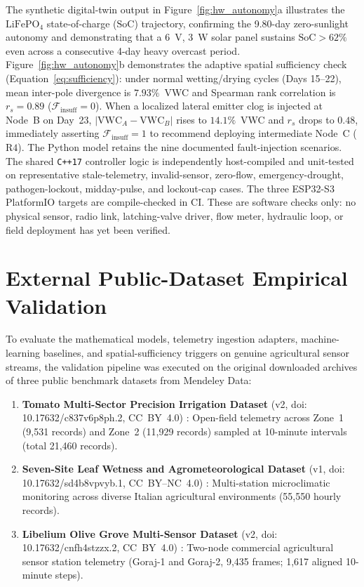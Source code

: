 \documentclass[10pt,twocolumn,a4paper]{article}
\begin{document}
The synthetic digital-twin output in Figure~\ref{fig:hw_autonomy}a illustrates the $\mathrm{LiFePO_4}$ state-of-charge ($\mathrm{SoC}$) trajectory, confirming the 9.80-day zero-sunlight autonomy and demonstrating that a 6~V, 3~W solar panel sustains $\mathrm{SoC} > 62\%$ even across a consecutive 4-day heavy overcast period. Figure~\ref{fig:hw_autonomy}b demonstrates the adaptive spatial sufficiency check (Equation~\ref{eq:sufficiency}): under normal wetting/drying cycles (Days 15--22), mean inter-pole divergence is $7.93\%$~VWC and Spearman rank correlation is $r_s = 0.89$ ($\mathcal{F}_{\text{insuff}} = 0$). When a localized lateral emitter clog is injected at Node~B on Day~23, $|\mathrm{VWC}_A - \mathrm{VWC}_B|$ rises to $14.1\%$~VWC and $r_s$ drops to $0.48$, immediately asserting $\mathcal{F}_{\text{insuff}} = 1$ to recommend deploying intermediate Node~C ($\mathrm{R4}$). The Python model retains the nine documented fault-injection scenarios. The shared \texttt{C++17} controller logic is independently host-compiled and unit-tested on representative stale-telemetry, invalid-sensor, zero-flow, emergency-drought, pathogen-lockout, midday-pulse, and lockout-cap cases. The three ESP32-S3 PlatformIO targets are compile-checked in CI. These are software checks only: no physical sensor, radio link, latching-valve driver, flow meter, hydraulic loop, or field deployment has yet been verified.

\section{External Public-Dataset Empirical Validation}

To evaluate the mathematical models, telemetry ingestion adapters, machine-learning baselines, and spatial-sufficiency triggers on genuine agricultural sensor streams, the validation pipeline was executed on the original downloaded archives of three public benchmark datasets from Mendeley Data:
\begin{enumerate}\setlength{\itemsep}{1pt}\setlength{\parskip}{0pt}
  \item \textbf{Tomato Multi-Sector Precision Irrigation Dataset} (v2, doi: 10.17632/c837v6p8ph.2, CC~BY~4.0) \cite{mendeley_tomato}: Open-field telemetry across Zone~1 (9,531 records) and Zone~2 (11,929 records) sampled at 10-minute intervals (total 21,460 records).
  \item \textbf{Seven-Site Leaf Wetness and Agrometeorological Dataset} (v1, doi: 10.17632/sd4b8vpvyb.1, CC~BY--NC~4.0) \cite{mendeley_lws}: Multi-station microclimatic monitoring across diverse Italian agricultural environments (55,550 hourly records).
  \item \textbf{Libelium Olive Grove Multi-Sensor Dataset} (v2, doi: 10.17632/cnfh4stzzx.2, CC~BY~4.0) \cite{mendeley_libelium}: Two-node commercial agricultural sensor station telemetry (Goraj-1 and Goraj-2, 9,435 frames; 1,617 aligned 10-minute steps).
\end{enumerate}
\end{document}
